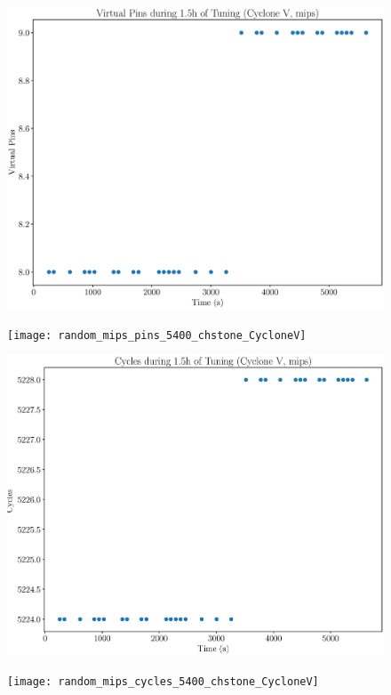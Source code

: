 \documentclass[12pt, a4paper]{article}
\begin{document}
\begin{figure}[htpb]
    \begin{minipage}{.48\textwidth}
        \includegraphics[scale=.25]{mips_pins_5400_chstone_CycloneV}
    \end{minipage}%
    \hfill
    \begin{minipage}{.48\textwidth}
        \texttt{[image: random\_mips\_pins\_5400\_chstone\_CycloneV]}
    \end{minipage}%

    \begin{minipage}{.48\textwidth}
        \includegraphics[scale=.25]{mips_cycles_5400_chstone_CycloneV}
    \end{minipage}%
    \hfill
    \begin{minipage}{.48\textwidth}
        \texttt{[image: random\_mips\_cycles\_5400\_chstone\_CycloneV]}
    \end{minipage}%
\end{figure}
\end{document}
